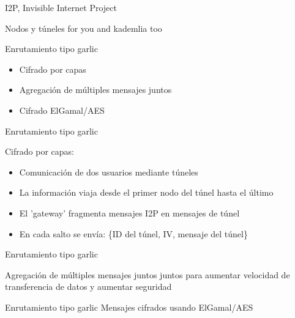 \documentclass[spanish]{beamer}
\begin{document}
\begin{frame}{I2P, Invisible Internet Project}
	
	Nodos y túneles for you
	and kademlia too	
	
\end{frame}






\begin{frame}{Enrutamiento tipo garlic}
	


\begin{itemize}
	\item Cifrado por capas
	\item Agregación de múltiples mensajes juntos
	\item Cifrado ElGamal/AES
\end{itemize}
	
	
\end{frame}







\begin{frame}{Enrutamiento tipo garlic}

Cifrado por capas:


\begin{itemize}
	\item Comunicación de dos usuarios mediante túneles
	\item La información viaja desde el primer nodo del túnel hasta el último
	\item El 'gateway' fragmenta mensajes I2P en mensajes de túnel
	\item En cada salto se envía: \{ID del túnel, IV, mensaje del túnel\}
\end{itemize}


\end{frame}


\begin{frame}{Enrutamiento tipo garlic}


Agregación de múltiples mensajes juntos juntos para aumentar velocidad de transferencia de datos y aumentar seguridad
	
	
\end{frame}



\begin{frame}{Enrutamiento tipo garlic}
	Mensajes cifrados usando ElGamal/AES
\end{frame}
\end{document}
